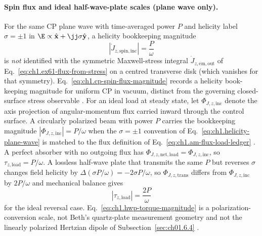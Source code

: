 \paragraph{Spin flux and ideal half-wave-plate scales (plane wave only).}
For the same CP plane wave with time-averaged power $P$ and helicity label $\sigma=\pm1$ in $\E\propto\hat{\mathbf{x}}+\jj\sigma\hat{\mathbf{y}}$, a helicity bookkeeping magnitude
\begin{equation}
\label{eq:ch1.cp-spin-flux-magnitude}
|\dot J_{z,\mathrm{spin,inc}}|=\frac{P}{\omega}
\end{equation}
is \emph{not} identified with the symmetric Maxwell-stress integral $\dot J_{z,\mathrm{em,out}}$ of Eq.~\eqref{eq:ch1.ex61-flux-from-stress} on a centred transverse disk (which vanishes for that symmetry). Eq.~\eqref{eq:ch1.cp-spin-flux-magnitude} records a helicity book-keeping magnitude for uniform CP in vacuum, distinct from the governing closed-surface stress observable \cite{stratton1941,beth1936,belinfante1940}. For an ideal load at steady state, let $\Phi_{J,z,\mathrm{inc}}$ denote the axis projection of angular-momentum flux carried inward through the control surface. A circularly polarized beam with power $P$ carries the bookkeeping magnitude $|\Phi_{J,z,\mathrm{inc}}|=P/\omega$ when the $\sigma=\pm1$ convention of Eq.~\eqref{eq:ch1.helicity-plane-wave} is matched to the flux definition of Eq.~\eqref{eq:ch1.am-flux-load-ledger} \cite{beth1936,stratton1941}. A perfect absorber with no outgoing flux has $\Phi_{J,z,\mathrm{net,load}}=\Phi_{J,z,\mathrm{inc}}$, so $\tau_{z,\mathrm{load}}=P/\omega$. A lossless half-wave plate that transmits the same $P$ but reverses $\sigma$ changes field helicity by $\Delta(\sigma P/\omega)=-2\sigma P/\omega$, so $\Phi_{J,z,\mathrm{trans}}$ differs from $\Phi_{J,z,\mathrm{inc}}$ by $2P/\omega$ and mechanical balance gives
\begin{equation}
\label{eq:ch1.hwp-torque-magnitude}
|\tau_{z,\mathrm{load}}|=\frac{2P}{\omega}
\end{equation}
for the ideal reversal case. Eq.~\eqref{eq:ch1.hwp-torque-magnitude} is a polarization-conversion scale, not Beth's quartz-plate measurement geometry and not the linearly polarized Hertzian dipole of Subsection~\ref{sec:ch01.6.4} \cite{beth1936,stratton1941}.

